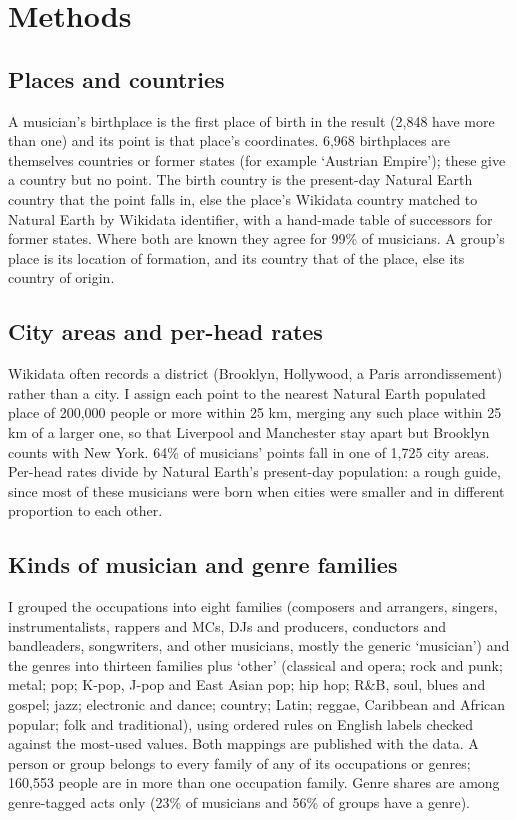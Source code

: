 \documentclass[11pt,a4paper]{article}
\begin{document}
\section{Methods}
\subsection{Places and countries}
A musician's birthplace is the first place of birth in the result (2,848 have more than one) and its point is that place's coordinates. 6,968 birthplaces are themselves countries or former states (for example `Austrian Empire'); these give a country but no point. The birth country is the present-day Natural Earth country that the point falls in, else the place's Wikidata country matched to Natural Earth by Wikidata identifier, with a hand-made table of successors for former states. Where both are known they agree for 99\% of musicians. A group's place is its location of formation, and its country that of the place, else its country of origin.

\subsection{City areas and per-head rates}
Wikidata often records a district (Brooklyn, Hollywood, a Paris arrondissement) rather than a city. I assign each point to the nearest Natural Earth populated place of 200,000 people or more within 25 km, merging any such place within 25 km of a larger one, so that Liverpool and Manchester stay apart but Brooklyn counts with New York. 64\% of musicians' points fall in one of 1,725 city areas. Per-head rates divide by Natural Earth's present-day population: a rough guide, since most of these musicians were born when cities were smaller and in different proportion to each other.

\subsection{Kinds of musician and genre families}
I grouped the occupations into eight families (composers and arrangers, singers, instrumentalists, rappers and MCs, DJs and producers, conductors and bandleaders, songwriters, and other musicians, mostly the generic `musician') and the genres into thirteen families plus `other' (classical and opera; rock and punk; metal; pop; K-pop, J-pop and East Asian pop; hip hop; R\&B, soul, blues and gospel; jazz; electronic and dance; country; Latin; reggae, Caribbean and African popular; folk and traditional), using ordered rules on English labels checked against the most-used values. Both mappings are published with the data. A person or group belongs to every family of any of its occupations or genres; 160,553 people are in more than one occupation family. Genre shares are among genre-tagged acts only (23\% of musicians and 56\% of groups have a genre).
\end{document}
